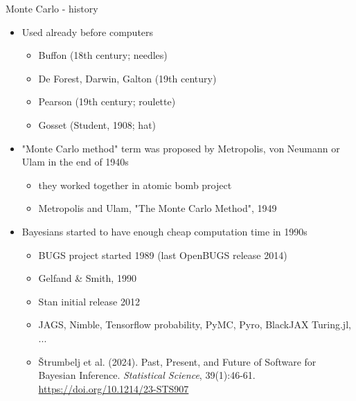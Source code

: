 \documentclass[english,t]{beamer}
\begin{document}
\begin{frame}{Monte Carlo - history}

  \begin{itemize}
  \item Used already before computers
    \begin{itemize}
      \item Buffon (18th century; needles)
      \item De Forest, Darwin, Galton (19th century)
      \item Pearson (19th century; roulette)
      \item Gosset (Student, 1908; hat)
    \end{itemize}
    \pause
  \item "Monte Carlo method" term was proposed by Metropolis, von Neumann
    or Ulam in the end of 1940s
     \begin{itemize}
     \item they worked together in atomic bomb project
     \item Metropolis and Ulam, "The Monte Carlo Method", 1949
     \end{itemize}
    \pause
   \item Bayesians started to have enough cheap computation time in 1990s
     \begin{itemize}
     \item BUGS project started 1989 (last OpenBUGS release 2014)
     \item Gelfand \& Smith, 1990
       \pause
     \item Stan initial release 2012
     \item JAGS, Nimble, Tensorflow probability, PyMC, Pyro, BlackJAX
       Turing.jl, ...
     \item  Štrumbelj et al. (2024). Past, Present, and Future of Software for Bayesian Inference. \textit{Statistical Science}, 39(1):46-61. \url{https://doi.org/10.1214/23-STS907}
     \end{itemize}
  \end{itemize}

\end{frame}

\end{document}
